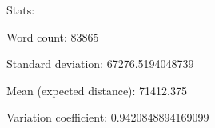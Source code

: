 Stats: 

Word count: 83865

Standard deviation: 67276.5194048739

Mean (expected distance): 71412.375

Variation coefficient: 0.9420848894169099


